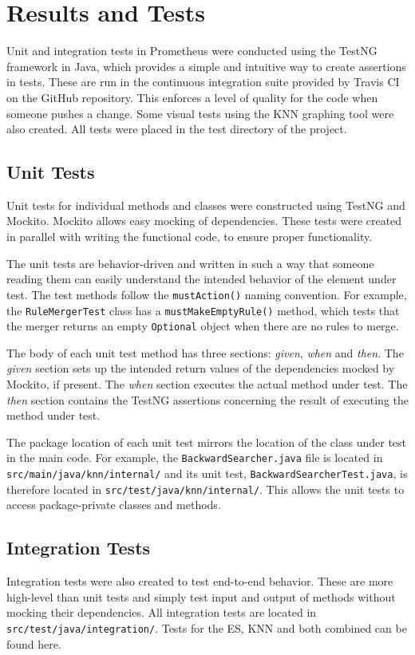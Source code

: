 \documentclass[titlepage,11pt]{article}
\newcommand{\code}[1]{\texttt{#1}}
\begin{document}
\section{Results and Tests} \label{sec:results}
Unit and integration tests in Prometheus were conducted using the TestNG framework in Java, which provides a simple and intuitive way to create assertions in tests. These are run in the continuous integration suite provided by Travis CI on the GitHub repository. This enforces a level of quality for the code when someone pushes a change. Some visual tests using the KNN graphing tool were also created. All tests were placed in the test directory of the project.

\subsection{Unit Tests}
Unit tests for individual methods and classes were constructed using TestNG and Mockito. Mockito allows easy mocking of dependencies. These tests were created in parallel with writing the functional code, to ensure proper functionality. 

The unit tests are behavior-driven and written in such a way that someone reading them can easily understand the intended behavior of the element under test. The test methods follow the \code{mustAction()} naming convention. For example, the \code{RuleMergerTest} class has a \code{mustMakeEmptyRule()} method, which tests that the merger returns an empty \code{Optional} object when there are no rules to merge.

The body of each unit test method has three sections: \emph{given}, \emph{when} and \emph{then}. The \emph{given} section sets up the intended return values of the dependencies mocked by Mockito, if present. The \emph{when} section executes the actual method under test. The \emph{then} section contains the TestNG assertions concerning the result of executing the method under test.

The package location of each unit test mirrors the location of the class under test in the main code. For example, the \code{BackwardSearcher.java} file is located in \code{src/main/java/knn/internal/} and its unit test, \code{BackwardSearcherTest.java}, is therefore located in \code{src/test/java/knn/internal/}. This allows the unit tests to access package-private classes and methods.

\subsection{Integration Tests}
Integration tests were also created to test end-to-end behavior. These are more high-level than unit tests and simply test input and output of methods without mocking their dependencies. All integration tests are located in \code{src/test/java/integration/}. Tests for the ES, KNN and both combined can be found here.
\end{document}
